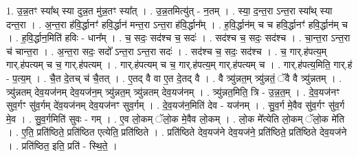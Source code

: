 \documentclass[17pt]{extarticle}
\begin{document}
1. उ॒न्न॒तꣳ स्या᳚थ् स्या दुन्न॒त मु॑न्न॒तꣳ स्या᳚त् । . उ॒न्न॒तमित्यु॑त् - न॒तम् । . स्या॒ द॒न्त॒रा ऽन्त॒रा स्या᳚थ् स्या दन्त॒रा । . अ॒न्त॒रा ह॑वि॒र्द्धानꣳ॑ हवि॒र्द्धान॑ मन्त॒रा ऽन्त॒रा ह॑वि॒र्द्धान᳚म् । . ह॒वि॒र्द्धान॑म् च च हवि॒र्द्धानꣳ॑ हवि॒र्द्धान॑म् च । . ह॒वि॒र्द्धान॒मिति॑ हविः - धान᳚म् । . च॒ सदः॒ सद॑श्च च॒ सदः॑ । . सद॑श्च च॒ सदः॒ सद॑श्च । . चा॒न्त॒रा ऽन्त॒रा च॑ चान्त॒रा । . अ॒न्त॒रा सदः॒ सदो᳚ ऽन्त॒रा ऽन्त॒रा सदः॑ । . सद॑श्च च॒ सदः॒ सद॑श्च । . च॒ गार्.ह॑पत्य॒म् गार्.ह॑पत्यम् च च॒ गार्.ह॑पत्यम् । . गार्.ह॑पत्यम् च च॒ गार्.ह॑पत्य॒म् गार्.ह॑पत्यम् च । . गार्.ह॑पत्य॒मिति॒ गार्.ह॑ - प॒त्य॒म् । . चै॒त दे॒तच् च॑ चै॒तत् । . ए॒तद् वै वा ए॒त दे॒तद् वै । . वै त्र्यु॑न्नत॒म् त्र्यु॑न्नतं॒ ॅवै वै त्र्यु॑न्नतम् । . त्र्यु॑न्नतम् देव॒यज॑नम् देव॒यज॑न॒म् त्र्यु॑न्नत॒म् त्र्यु॑न्नतम् देव॒यज॑नम् । . त्र्यु॑न्नत॒मिति॒ त्रि - उ॒न्न॒त॒म् । . दे॒व॒यज॑नꣳ सुव॒र्गꣳ सु॑व॒र्गम् दे॑व॒यज॑नम् देव॒यज॑नꣳ सुव॒र्गम् । . दे॒व॒यज॑न॒मिति॑ देव - यज॑नम् । . सु॒व॒र्ग मे॒वैव सु॑व॒र्गꣳ सु॑व॒र्ग मे॒व । . सु॒व॒र्गमिति॑ सुवः - गम् । . ए॒व लो॒कम् ॅलो॒क मे॒वैव लो॒कम् । . लो॒क मे᳚त्येति लो॒कम् ॅलो॒क मे॑ति । . ए॒ति॒ प्रति॑ष्ठिते॒ प्रति॑ष्ठित एत्येति॒ प्रति॑ष्ठिते । . प्रति॑ष्ठिते देव॒यज॑ने देव॒यज॑ने॒ प्रति॑ष्ठिते॒ प्रति॑ष्ठिते देव॒यज॑ने । . प्रति॑ष्ठित॒ इति॒ प्रति॑ - स्थि॒ते॒ । \newline
\end{document}
